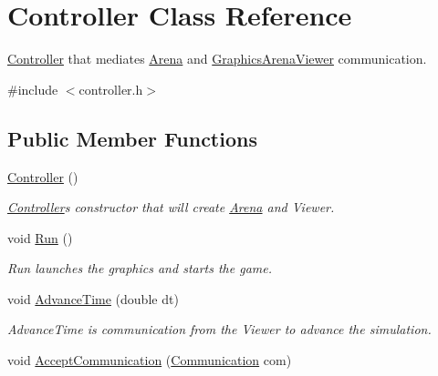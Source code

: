 \hypertarget{classController}{}\section{Controller Class Reference}
\label{classController}


\hyperlink{classController}{Controller} that mediates \hyperlink{classArena}{Arena} and \hyperlink{classGraphicsArenaViewer}{Graphics\+Arena\+Viewer} communication.  




{\ttfamily \#include $<$controller.\+h$>$}

\subsection*{Public Member Functions}
\begin{DoxyCompactItemize}
\item 
\hyperlink{classController_a95c56822d667e94b031451729ce069a9}{Controller} ()\hypertarget{classController_a95c56822d667e94b031451729ce069a9}{}\label{classController_a95c56822d667e94b031451729ce069a9}

\begin{DoxyCompactList}\small\item\em \hyperlink{classController}{Controller}\textquotesingle{}s constructor that will create \hyperlink{classArena}{Arena} and Viewer. \end{DoxyCompactList}\item 
void \hyperlink{classController_a17abb2cec6c0109e9b2df3cdc082eaad}{Run} ()\hypertarget{classController_a17abb2cec6c0109e9b2df3cdc082eaad}{}\label{classController_a17abb2cec6c0109e9b2df3cdc082eaad}

\begin{DoxyCompactList}\small\item\em Run launches the graphics and starts the game. \end{DoxyCompactList}\item 
void \hyperlink{classController_a6a4a3eaee03f6c4718da3f8293d7e053}{Advance\+Time} (double dt)\hypertarget{classController_a6a4a3eaee03f6c4718da3f8293d7e053}{}\label{classController_a6a4a3eaee03f6c4718da3f8293d7e053}

\begin{DoxyCompactList}\small\item\em Advance\+Time is communication from the Viewer to advance the simulation. \end{DoxyCompactList}\item 
void \hyperlink{classController_a55b8d46984535adb91f40309914e8852}{Accept\+Communication} (\hyperlink{communication_8h_a836c27e2d64d0efa4a526150bdf6f3e5}{Communication} com)\hypertarget{classController_a55b8d46984535adb91f40309914e8852}{}\label{classController_a55b8d46984535adb91f40309914e8852}


\end{DoxyCompactItemize}
